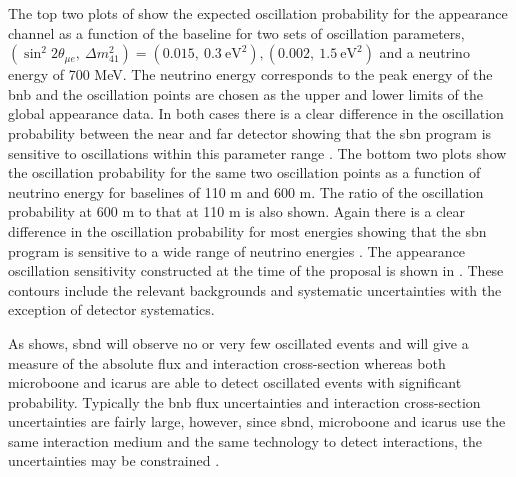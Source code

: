 The top two plots of  show the expected oscillation probability for the \nue appearance channel as a function of the baseline for two sets of oscillation parameters, $(\sin^2{2\theta_{\mu e}}, ~\Delta m^2_{41}) = (0.015, ~0.3~\text{eV}^2), (0.002, ~1.5~\text{eV}^2)$ and a neutrino energy of 700 MeV. The neutrino energy corresponds to the peak energy of the \gls{bnb} and the oscillation points are chosen as the upper and lower limits of the global \nue appearance data. In both cases there is a clear difference in the oscillation probability between the near and far detector showing that the \gls{sbn} program is sensitive to oscillations within this parameter range \cite{SBN_paper}. The bottom two plots show the oscillation probability for the same two oscillation points as a function of neutrino energy for baselines of 110 m and 600 m. The ratio of the oscillation probability at 600 m to that at 110 m is also shown. Again there is a clear difference in the oscillation probability for most energies showing that the \gls{sbn} program is sensitive to a wide range of neutrino energies \cite{SBN_paper}. The \nue appearance oscillation sensitivity constructed at the time of the proposal is shown in . These contours include the relevant backgrounds and systematic uncertainties with the exception of detector systematics. 

As  shows, \gls{sbnd} will observe no or very few oscillated events and will give a measure of the absolute flux and interaction cross-section whereas both \gls{microboone} and \gls{icarus} are able to detect oscillated events with significant probability. Typically the \gls{bnb} flux uncertainties and interaction cross-section uncertainties are fairly large, however, since \gls{sbnd}, \gls{microboone} and \gls{icarus} use the same
interaction medium and the same technology to detect interactions, the uncertainties may be constrained \cite{SBN_paper}.


